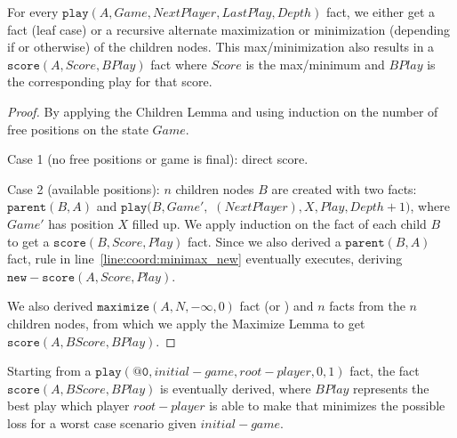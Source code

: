 \begin{theorem}

For every $\mathtt{play}(A, Game, NextPlayer, LastPlay, Depth)$ fact, we either
get a  fact (leaf case) or a recursive alternate maximization or
minimization (depending if  or otherwise) of the
children nodes. This max/minimization also results in a $\mathtt{score}(A,
Score, BPlay)$ fact where $Score$ is the max/minimum and $BPlay$ is the
corresponding play for that score.

\end{theorem}
\begin{proof}
By applying the Children Lemma and using induction on the number of free
positions on the state $Game$.

Case 1 (no free positions or game is final): direct score.

Case 2 (available positions): $n$ children nodes $B$ are created with two facts:
$\mathtt{parent}(B, A)$ and $\mathtt{play}(B, Game',$
$(NextPlayer), X, Play, Depth + 1)$, where $Game'$ has
position $X$ filled up. We apply induction on the  fact of each child
$B$ to get a $\mathtt{score}(B, Score, Play)$ fact. Since we also derived a
$\mathtt{parent}(B, A)$ fact, rule in line~\ref{line:coord:minimax_new}
eventually executes, deriving $\mathtt{new-score}(A, Score, Play)$.

We also derived $\mathtt{maximize}(A, N, -\infty, 0)$ fact (or )
and $n$  facts from the $n$ children nodes, from which we apply
the Maximize Lemma to get $\mathtt{score}(A, BScore, BPlay)$.

\end{proof}

\begin{corollary}[MiniMax]

Starting from a $\mathtt{play}(\mathtt{@0}, initial-game, root-player, 0, 1)$
fact, the fact $\mathtt{score}(A, BScore, BPlay)$ is eventually derived,
where $BPlay$ represents the best play which player $root-player$ is able to
make that minimizes the possible loss for a worst case scenario given
$initial-game$.

\end{corollary}
